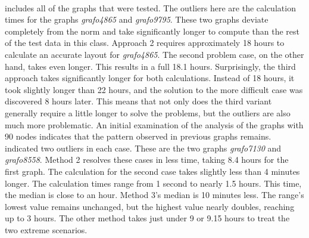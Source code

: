 \documentclass[bachelor, english]{algothesis}
\begin{document}
\\
 includes all of the graphs that were tested. The outliers here are the calculation times for the graphs \textit{grafo4865} and \textit{grafo9795}. These two graphs deviate completely from the norm and take significantly longer to compute than the rest of the test data in this class.
Approach 2 requires approximately 18 hours to calculate an accurate layout for \textit{grafo4865}. The second problem case, on the other hand, takes even longer. This results in a full 18.1 hours. Surprisingly, the third approach takes significantly longer for both calculations. Instead of 18 hours, it took slightly longer than 22 hours, and the solution to the more difficult case was discovered 8 hours later. This means that not only does the third variant generally require a little longer to solve the problems, but the outliers are also much more problematic.
\noindent
\newline
\newline
An initial examination of the analysis of the graphs with 90 nodes indicates that the pattern observed in previous graphs remains.  indicated two outliers in each case. These are the two graphs \textit{grafo7130} and \textit{grafo8558}. Method 2 resolves these cases in less time, taking 8.4 hours for the first graph. The calculation for the second case takes slightly less than 4 minutes longer. The calculation times range from 1 second to nearly 1.5 hours. This time, the median is close to an hour.
\newline
Method 3's median is 10 minutes less. The range's lowest value remains unchanged, but the highest value nearly doubles, reaching up to 3 hours. The other method takes just under 9 or 9.15 hours to treat the two extreme scenarios.
\end{document}
